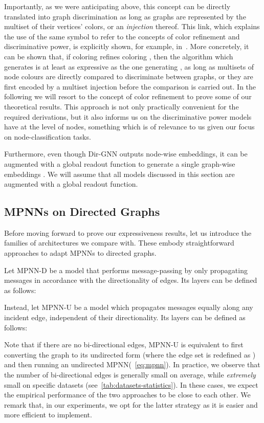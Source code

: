 \documentclass{article}
\newcommand\oursacro{Dir-GNN}
\theoremstyle{plain}
\theoremstyle{definition}
\theoremstyle{remark}
\begin{document}
Importantly, as we were anticipating above, this concept can be directly translated into graph discrimination as long as graphs are represented by the multiset of their vertices' colors, or an \emph{injection} thereof. This link, which explains the use of the same symbol to refer to the concepts of color refinement and discriminative power, is explicitly shown, for example, in~\citet{pmlr-v139-bodnar21a,bevilacqua2022equivariant}. More concretely, it can be shown that, if coloring  refines coloring , then the algorithm which generates  is at least as expressive as the one generating , as long as multisets of node colours are directly compared to discriminate between graphs, or they are first encoded by a multiset injection before the comparison is carried out. In the following we will resort to the concept of color refinement to prove some of our theoretical results. This approach is not only practically convenient for the required derivations, but it also informs us on the discriminative power models have at the level of nodes, something which is of relevance to us given our focus on node-classification tasks.

Furthermore, even though \oursacro{} outputs node-wise embeddings, it can be augmented with a global readout function to generate a single graph-wise embeddings . We will assume that all models discussed in this section are augmented with a global readout function.

\subsection{MPNNs on Directed Graphs}

Before moving forward to prove our expressiveness results, let us introduce the families of architectures we compare with. These embody straightforward approaches to adapt MPNNs to directed graphs.

Let MPNN-D be a model that performs message-passing by only propagating messages in accordance with the directionality of edges. Its layers can be defined as follows:



Instead, let MPNN-U be a model which propagates messages equally along any incident edge, independent of their directionality. Its layers can be defined as follows:


Note that if there are no bi-directional edges, MPNN-U is equivalent to first converting the graph to its undirected form (where the edge set is redefined as ) and then running an undirected MPNN(~\cref{eq:mpnn}). In practice, we observe that the number of bi-directional edges is generally small on average, while \emph{extremely} small on specific datasets (see~\cref{tab:datasets-statistics}). In these cases, we expect the empirical performance of the two approaches to be close to each other. We remark that, in our experiments, we opt for the latter strategy as it is easier and more efficient to implement.
\end{document}
